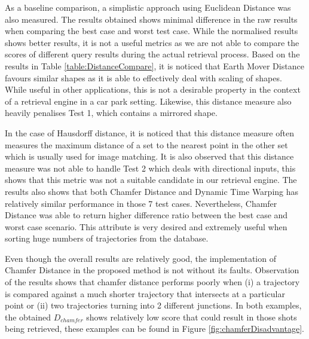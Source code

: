 As a baseline comparison, a simplistic approach using Euclidean Distance was also measured. The results obtained shows minimal difference in the raw results when comparing the best case and worst test case. While the normalised results shows better results, it is not a useful metrics as we are not able to compare the scores of different query results during the actual retrieval process.
Based on the results in Table \ref{table:DistanceCompare}, it is noticed that Earth Mover Distance favours similar shapes as it is able to effectively deal with scaling of shapes. While useful in other applications, this is not a desirable property in the context of a retrieval engine in a car park setting. Likewise, this distance measure also heavily penalises Test 1, which contains a mirrored shape.

In the case of Hausdorff distance, it is noticed that this distance measure often measures the maximum distance of a set to the nearest point in the other set which is usually used for image matching. It is also observed that this distance measure was not able to handle Test 2 which deals with directional inputs, this shows that this metric was not a suitable candidate in our retrieval engine.
The results also shows that both Chamfer Distance and Dynamic Time Warping has relatively similar performance in those 7 test cases. Nevertheless, Chamfer Distance was able to return higher difference ratio between the best case and worst case scenario. This attribute is very desired and extremely useful when sorting huge numbers of trajectories from the database.


Even though the overall results are relatively good, the implementation of Chamfer Distance in the proposed method is not without its faults. Observation of the results shows that chamfer distance performs poorly when (i) a trajectory is compared against a much shorter trajectory that intersects at a particular point or (ii) two trajectories turning into 2 different junctions. In both examples, the obtained $D_{chamfer}$ shows relatively low score that could result in those shots being retrieved, these examples can be found in Figure  \ref{fig:chamferDisadvantage}.

